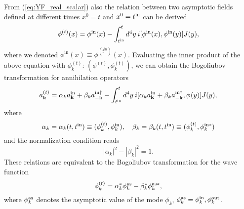 \documentclass[twocolumn,showpacs,preprintnumbers,amsmath,amssymb,nofootinbib,superscriptaddress,prc]{revtex4}
\begin{document}
From (\ref{eq:YF_real_scalar}) also the relation between two asymptotic fields defined at different times $x^0=t$ and $x^0=t^{\rm in}$ can be derived 
\begin{equation}
 \phi^{(t)}(x) = \phi^{\rm in}(x)-\int_{t^{\rm in}}^{t}d^4y \: i[\phi^{\rm in}(x), \phi^{\rm in}(y)]J(y),\label{eq:relation_t_in}
\end{equation}
where we denoted $\phi^{\text{in}} (x) \equiv \phi^{(t^{\text{in}})} (x) $. Evaluating the inner product of the above equation with $\phi_k^{(t)}$: $\left( \phi^{(t)}, \phi_k^{(t)} \right)$, we can obtain the Bogoliubov transformation for annihilation operators \cite{Enomoto:2014cna}
\begin{equation}
 a_{\mathbf{k}}^{(t)}=\alpha_ka_{\mathbf{k}}^{\rm in}+\beta_ka_{-\mathbf{k}}^{{\rm in}\dagger}
   - \int_{t^{\rm in}}^td^4y \: i[\alpha_k a_{\mathbf{k}}^{\rm in}+\beta_ka_{\mathbf{-k}}^{{\rm in}\dagger},
  \phi^{\rm }(y)]J(y), \label{eq:BTA_real_scalar}
\end{equation}
where
\begin{equation}
 \alpha_k=\alpha_k(t,t^{\rm in})\equiv(\phi_k^{(t)},\phi_k^{\rm in}), \quad \beta_k=\beta_k(t,t^{\rm in})\equiv(\phi_k^{(t)},\phi_k^{{\rm in}*})
\end{equation}
and the normalization condition reads
\begin{equation}
|\alpha_k|^2-|\beta_k|^2=1.
\end{equation}
These relations are equivalent to the Bogoliubov transformation for the wave function
\begin{equation}
 \phi_k^{(t)}=\alpha_k^*\phi_k^{\rm as}-\beta_k^*\phi_k^{{\rm as}*},
\end{equation}
where $\phi_k^{\rm as}$ denotes the asymptotic value of the mode $\phi_k$, $\phi_k^{\rm as} = \phi_k^{\rm in}, \phi_k^{\rm out} $.
\end{document}
